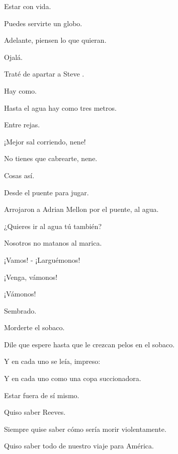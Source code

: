 \sk
Estar con vida. 

\sk
Puedes servirte un globo. 

\sk
Adelante, piensen lo que quieran. 

\sk
Ojalá. 

\sk
Traté de apartar a Steve . 

\sk
Hay como. 

\sk
Hasta el agua hay como tres metros. 

\sk
Entre rejas. 

\sk
¡Mejor sal corriendo, nene! 

\sk
No tienes que cabrearte, nene. 

\sk
Cosas así. 

\sk
Desde el puente para jugar. 

\sk
Arrojaron a Adrian Mellon por el puente, al agua.\nb{}

\sk
¿Quieres ir al agua tú también?\nb{}

\sk
Nosotros no matanos al marica. 

\sk
¡Vamos! - ¡Larguémonos! 

\sk
¡Venga, vámonos! 

\sk
¡Vámonos!

\sk
Sembrado. 

\sk
Morderte el sobaco. \nb{}

\sk
Dile que espere hasta que le crezcan pelos en el sobaco. 

\sk
Y en cada uno se leía, impreso: 

\sk
Y en cada uno como una copa succionadora. 

\sk
Estar fuera de sí mismo. 

\sk
Quiso saber Reeves. 

\sk
Siempre quise saber cómo sería morir violentamente. 

\sk
Quiso saber todo de nuestro viaje para América. 

